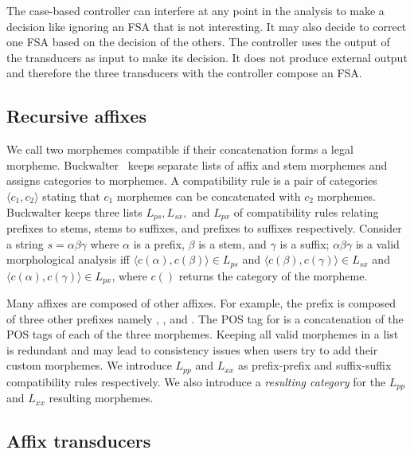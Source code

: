 \documentclass[11pt]{article}
\begin{document}
The case-based controller can interfere at any point in the 
analysis to make a decision like ignoring an FSA that 
is not interesting. 
It may also decide to correct one FSA
based on the decision of the others. 
The controller uses the output of the transducers as input
to make its decision. 
It does not produce external output and therefore 
the three transducers with the 
controller compose an FSA.

\subsection{Recursive affixes}
\label{sec:recaffix}

We call two morphemes compatible if their concatenation
forms a legal morpheme. 
Buckwalter~ keeps separate lists 
of affix and stem morphemes and assigns categories to
morphemes. 
A compatibility rule is a pair of categories 
$\langle c_1, c_2\rangle$  stating that $c_1$ morphemes
can be concatenated with $c_2$ morphemes.
Buckwalter keeps three lists $L_{ps}, L_{sx},$ and $L_{px}$ 
of compatibility rules relating
prefixes to stems, stems to suffixes, and prefixes to suffixes
respectively. 
Consider a string $s=\alpha\beta\gamma$ where $\alpha$ is 
a prefix, $\beta$ is a stem, and $\gamma$ is a suffix;
$\alpha\beta\gamma$ is a 
valid morphological analysis iff
$\langle c(\alpha),c(\beta)\rangle \in L_{ps}$ and
$\langle c(\beta),c(\gamma)\rangle \in L_{sx}$ and
$\langle c(\alpha),c(\gamma)\rangle \in L_{px}$, where
$c()$ returns the category of the morpheme.

Many affixes are composed of other affixes. For example,
the prefix  is composed of three other prefixes
namely , , and .
The POS tag for  is a concatenation
of the POS tags of each of the three morphemes. 
Keeping all valid morphemes in a list
is redundant and may lead to consistency issues when
users try to add their custom morphemes.
We introduce $L_{pp}$ and
$L_{xx}$ as prefix-prefix and suffix-suffix 
compatibility rules respectively.
We also introduce a {\em resulting category}
for the $L_{pp}$ and  $L_{xx}$ resulting morphemes.


\subsection{Affix transducers}
\label{sec:affixFSA}
\end{document}
